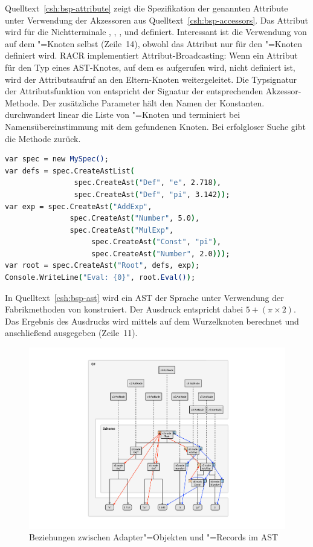 Quelltext~\ref{csh:bsp-attribute} zeigt die Spezifikation der genannten Attribute unter Verwendung der Akzessoren aus Quelltext~\ref{csh:bsp-accessors}. Das Attribut  wird für die Nichtterminale , , ,  und  definiert. Interessant ist die Verwendung von  auf dem "=Knoten selbst (Zeile~14), obwohl das Attribut  nur für den "=Knoten definiert wird. RACR implementiert Attribut-Broadcasting: Wenn ein Attribut für den Typ eines AST-Knotes, auf dem es aufgerufen wird, nicht definiert ist, wird der Attributsaufruf an den Eltern-Knoten weitergeleitet. Die Typsignatur der Attributsfunktion von  entspricht der Signatur der entsprechenden Akzessor-Methode. Der zusätzliche Parameter hält den Namen der Konstanten.  durchwandert linear die Liste von "=Knoten und terminiert bei Namensübereinstimmung mit dem gefundenen Knoten. Bei erfolgloser Suche gibt die Methode  zurück.

\begin{lstlisting}[language=csh, caption={AST-Konstruktion}, label=csh:bsp-ast]
var spec = new MySpec();
var defs = spec.CreateAstList(
				spec.CreateAst("Def", "e", 2.718),
				spec.CreateAst("Def", "pi", 3.142));
var exp = spec.CreateAst("AddExp",
			   spec.CreateAst("Number", 5.0),
			   spec.CreateAst("MulExp",
					spec.CreateAst("Const", "pi"),
					spec.CreateAst("Number", 2.0)));
var root = spec.CreateAst("Root", defs, exp);
Console.WriteLine("Eval: {0}", root.Eval());
\end{lstlisting}

In Quelltext~\ref{csh:bsp-ast} wird ein AST der Sprache unter Verwendung der Fabrikmethoden von  konstruiert. Der Ausdruck entspricht dabei $5+(\pi\times2)$. Das Ergebnis des Ausdrucks wird mittels  auf dem Wurzelknoten berechnet und anschließend ausgegeben (Zeile~11).

\begin{figure}[ht!]
	\centering
	\includegraphics[width=0.9\linewidth]{figures/example-mapping.pdf}
	\caption{Beziehungen zwischen Adapter"=Objekten und "=Records im AST}
	\label{fig:bsp-graph}
\end{figure}

